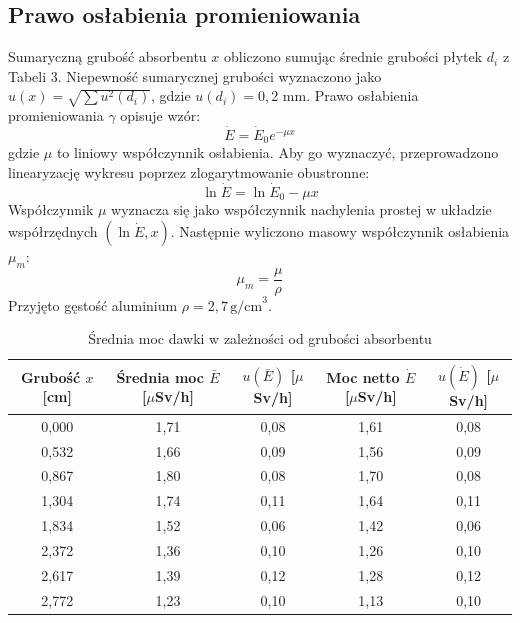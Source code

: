 \documentclass{article}
\begin{document}
\subsection{Prawo osłabienia promieniowania}
Sumaryczną grubość absorbentu $x$ obliczono sumując średnie grubości płytek $d_i$ z Tabeli 3. Niepewność sumarycznej grubości wyznaczono jako $u(x) = \sqrt{\sum u^2(d_i)}$, gdzie $u(d_i) = 0,2$ mm. Prawo osłabienia promieniowania $\gamma$ opisuje wzór:
\begin{equation}
\dot{E} = \dot{E}_0 e^{-\mu x}
\end{equation}
gdzie $\mu$ to liniowy współczynnik osłabienia. Aby go wyznaczyć, przeprowadzono linearyzację wykresu poprzez zlogarytmowanie obustronne:
\begin{equation}
\ln \dot{E} = \ln \dot{E}_0 - \mu x
\end{equation}
Współczynnik $\mu$ wyznacza się jako współczynnik nachylenia prostej w układzie współrzędnych $(\ln \dot{E}, x)$. Następnie wyliczono masowy współczynnik osłabienia $\mu_m$:
\begin{equation}
\mu_m = \frac{\mu}{\rho}
\end{equation}
Przyjęto gęstość aluminium $\rho = 2,7 \, \text{g/cm}^3$.

\begin{table}[H]
\centering
\caption{Średnia moc dawki w zależności od grubości absorbentu}
\small
\renewcommand{\arraystretch}{1.2}
\begin{tabular}{|c|c|c|c|c|}
\hline
\textbf{Grubość $x$ [cm]} & \textbf{Średnia moc $\bar{E}$ [$\mu$Sv/h]} & \textbf{$u(\bar{E})$ [$\mu$Sv/h]} & \textbf{Moc netto $\dot{E}$ [$\mu$Sv/h]} & \textbf{$u(\dot{E})$ [$\mu$Sv/h]} \\ \hline
0,000 & 1,71 & 0,08 & 1,61 & 0,08 \\ \hline
0,532 & 1,66 & 0,09 & 1,56 & 0,09 \\ \hline
0,867 & 1,80 & 0,08 & 1,70 & 0,08 \\ \hline
1,304 & 1,74 & 0,11 & 1,64 & 0,11 \\ \hline
1,834 & 1,52 & 0,06 & 1,42 & 0,06 \\ \hline
2,372 & 1,36 & 0,10 & 1,26 & 0,10 \\ \hline
2,617 & 1,39 & 0,12 & 1,28 & 0,12 \\ \hline
2,772 & 1,23 & 0,10 & 1,13 & 0,10 \\ \hline
\end{tabular}
\end{table}
\end{document}
